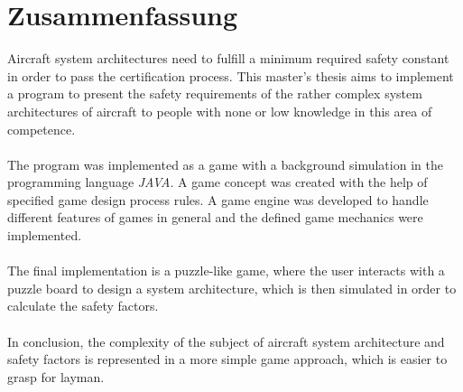 \section*{Zusammenfassung}
Aircraft system architectures need to fulfill a minimum required safety constant in order to pass the certification process.
This master’s thesis aims to implement a program to present the safety requirements of the rather complex system architectures
of aircraft to people with none or low knowledge in this area of competence.
\\ \\
The program was implemented as a game with a background simulation in the programming language \textit{JAVA}.
A game concept was created with the help of specified game design process rules.
A game engine was developed to handle different features of games in general and the defined game mechanics were implemented.
\\ \\
The final implementation is a puzzle-like game, where the user interacts with a puzzle board to design a system architecture,
which is then simulated in order to calculate the safety factors.
\\ \\
In conclusion, the complexity of the subject of aircraft system architecture and safety factors is represented in a more simple
game approach, which is easier to grasp for layman.
